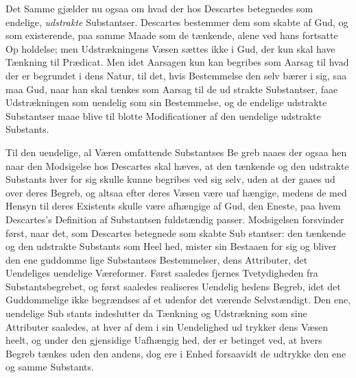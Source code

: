 \documentclass[12pt,a4paper]{book}
\begin{document}
Det Samme gjælder nu ogsaa om hvad der hos Descartes
betegnedes som endelige, \emph{udstrakte} Substantser. Descartes
bestemmer dem som skabte af Gud, og som existerende, paa
samme Maade som de tænkende, alene ved hans fortsatte Op\-%
holdelse; men Udstrækningens Væsen sættes ikke i Gud, der
kun skal have Tænkning til Prædicat. Men idet Aarsagen
kun kan begribes som Aarsag til hvad der er begrundet i
dens Natur, til det, hvis Bestemmelse den selv bærer i sig,
saa maa Gud, naar han skal tænkes som Aarsag til de ud\-%
strakte Substantser, faae Udstrækningen som uendelig som sin
Bestemmelse, og de endelige udstrakte Substantser maae blive
til blotte Modificationer af den uendelige udstrakte Substants.

Til den uendelige, al Væren omfattende Substantses Be\-%
greb naaes der ogsaa hen naar den Modsigelse hos Descartes
skal hæves, at den tænkende og den udstrakte Substants hver
for sig skulle kunne begribes ved sig selv, uden at der gaaes
ud over deres Begreb, og altsaa efter deres Væsen være uaf\-%
hængige, medens de med Hensyn til deres Existents skulle være
afhængige af Gud, den Eneste, paa hvem Descartes's Definition
af Substantsen fuldstændig passer. Modsigelsen forsvinder
først, naar det, som Descartes betegnede som skabte Sub\-%
stantser: den tænkende og den udstrakte Substants som Heel\-%
hed, mister sin Bestaaen for sig og bliver den ene guddomme\-%
lige Substantses Bestemmelser, dens Attributer, det Uendeliges
uendelige Væreformer. Først saaledes fjernes Tvetydigheden
fra Substantsbegrebet, og først saaledes realiseres Uendelig\-%
hedens Begreb, idet det Guddommelige ikke begrændses af et
udenfor det værende Selvstændigt. Den ene, uendelige Sub\-%
stants indeslutter da Tænkning og Udstrækning som sine
Attributer saaledes, at hver af dem i sin Uendelighed ud\-%
trykker dens Væsen heelt, og under den gjensidige Uafhængig\-%
hed, der er betinget ved, at hvers Begreb tænkes uden den
andens, dog ere i Enhed forsaavidt de udtrykke den ene og
samme Substants.
\end{document}
